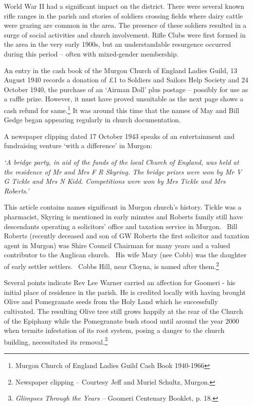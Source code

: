 World War II had a significant impact on the district. There were several known rifle ranges in the parish and stories of soldiers crossing fields where dairy cattle were grazing are common in the area. The presence of these soldiers resulted in a surge of social activities and church involvement. Rifle Clubs were first formed in the area in the very early 1900s, but an understandable resurgence occurred during this period -- often with mixed-gender membership.



An entry in the cash book of the Murgon Church of England Ladies Guild, 13 August 1940 records a donation of \pounds1 to Soldiers and Sailors Help Society and 24 October 1940, the purchase of an `Airman Doll' plus postage -- possibly for use as a raffle prize. However, it must have proved unsuitable as the next page shows a cash refund for same.\footnote{Murgon Church of England Ladies Guild Cash Book 1940-1966} It was around this time that the names of May and Bill Gedge began appearing regularly in church documentation.


A newspaper clipping dated 17 October 1943 speaks of an entertainment and fundraising venture `with a difference' in Murgon:



\emph{`A bridge party, in aid of the funds of the local Church of England, was held at the residence of Mr and Mrs F R Skyring. The bridge prizes were won by Mr V G Tickle and Mrs N Kidd. Competitions were won by Mrs Tickle and Mrs Roberts.'}



\smallskip


This article contains names significant in Murgon church's history. Tickle was a pharmacist, Skyring is mentioned in early minutes and Roberts family still have descendants operating a solicitors' office and taxation service in Murgon.~ Bill Roberts (recently deceased and son of GW Roberts the first solicitor and taxation agent in Murgon) was Shire Council Chairman for many years and a valued contributor to the Anglican church.~ His wife Mary (nee Cobb) was the daughter of early settler settlers.~ Cobbs Hill, near Cloyna, is named after them.\footnote{Newspaper clipping -- Courtesy Jeff and Muriel Schultz, Murgon.}


Several points indicate Rev Lee Warner carried an affection for Goomeri - his initial place of residence in the parish. He is credited locally with having brought Olive and Pomegranate seeds from the Holy Land which he successfully cultivated. The resulting Olive tree still grows happily at the rear of the Church of the Epiphany while the Pomegranate bush stood until around the year 2000 when termite infestation of its root system, posing a danger to the church building, necessitated its removal.\footnote{\emph{Glimpses Through the Years --} Goomeri Centenary Booklet, p. 18.}



